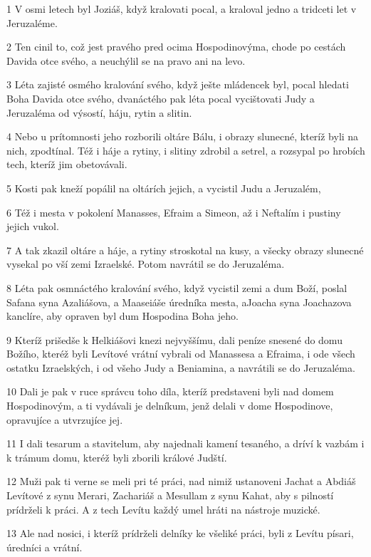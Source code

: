 \par 1 V osmi letech byl Joziáš, když kralovati pocal, a kraloval jedno a tridceti let v Jeruzaléme.
\par 2 Ten cinil to, což jest pravého pred ocima Hospodinovýma, chode po cestách Davida otce svého, a neuchýlil se na pravo ani na levo.
\par 3 Léta zajisté osmého kralování svého, když ješte mládencek byl, pocal hledati Boha Davida otce svého, dvanáctého pak léta pocal vycištovati Judy a Jeruzaléma od výsostí, háju, rytin a slitin.
\par 4 Nebo u prítomnosti jeho rozborili oltáre Bálu, i obrazy slunecné, kteríž byli na nich, zpodtínal. Též i háje a rytiny, i slitiny zdrobil a setrel, a rozsypal po hrobích tech, kteríž jim obetovávali.
\par 5 Kosti pak kneží popálil na oltárích jejich, a vycistil Judu a Jeruzalém,
\par 6 Též i mesta v pokolení Manasses, Efraim a Simeon, až i Neftalím i pustiny jejich vukol.
\par 7 A tak zkazil oltáre a háje, a rytiny stroskotal na kusy, a všecky obrazy slunecné vysekal po vší zemi Izraelské. Potom navrátil se do Jeruzaléma.
\par 8 Léta pak osmnáctého kralování svého, když vycistil zemi a dum Boží, poslal Safana syna Azaliášova, a Maaseiáše úredníka mesta, aJoacha syna Joachazova kanclíre, aby opraven byl dum Hospodina Boha jeho.
\par 9 Kteríž prišedše k Helkiášovi knezi nejvyššímu, dali peníze snesené do domu Božího, kteréž byli Levítové vrátní vybrali od Manassesa a Efraima, i ode všech ostatku Izraelských, i od všeho Judy a Beniamina, a navrátili se do Jeruzaléma.
\par 10 Dali je pak v ruce správcu toho díla, kteríž predstaveni byli nad domem Hospodinovým, a ti vydávali je delníkum, jenž delali v dome Hospodinove, opravujíce a utvrzujíce jej.
\par 11 I dali tesarum a stavitelum, aby najednali kamení tesaného, a dríví k vazbám i k trámum domu, kteréž byli zborili králové Judští.
\par 12 Muži pak ti verne se meli pri té práci, nad nimiž ustanoveni Jachat a Abdiáš Levítové z synu Merari, Zachariáš a Mesullam z synu Kahat, aby s pilností prídrželi k práci. A z tech Levítu každý umel hráti na nástroje muzické.
\par 13 Ale nad nosici, i kteríž prídrželi delníky ke všeliké práci, byli z Levítu písari, úredníci a vrátní.
